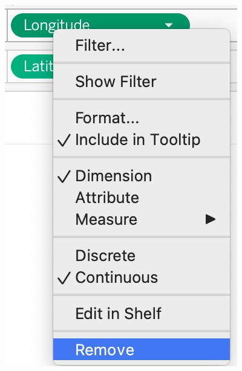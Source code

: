\documentclass[
]{book}
\begin{document}
\includegraphics{images/M3S2_remove-column.png}
\end{document}
